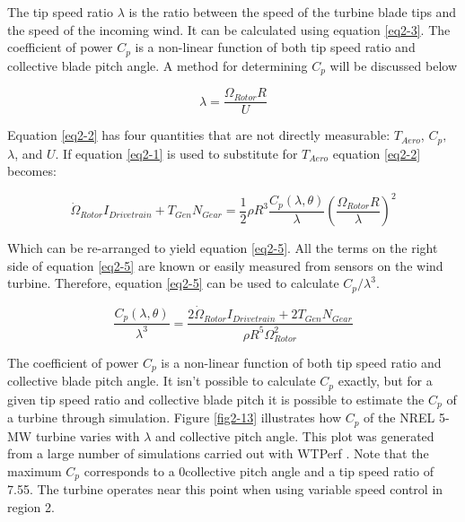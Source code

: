 The tip speed ratio $\lambda$ is the ratio between the speed of the turbine blade tips and the speed of the incoming wind. It can be calculated using equation \ref{eq2-3}. The coefficient of power $C_p$ is a non-linear function of both tip speed ratio and collective blade pitch angle. A method for determining $C_p$ will be discussed below

\begin{equation}
	\lambda=\frac{\Omega_{Rotor} R}{U} \label{eq2-3}
\end{equation}

Equation \ref{eq2-2} has four quantities that are not directly measurable: $T_{Aero}$, $C_p,$ $\lambda$, and $U$. If equation \ref{eq2-1} is used to substitute for $T_{Aero}$ equation \ref{eq2-2} becomes:

\begin{equation}
	\dot{\Omega }_{Rotor} I_{Drivetrain} + T_{Gen} N_{Gear} = \frac{1}{2} \rho R^3 \frac{C_p ( \lambda , \theta )}{\lambda} \left(\frac{\Omega_{Rotor} R}{\lambda}\right)^2   \label{eq2-4}
\end{equation}

Which can be re-arranged to yield equation \ref{eq2-5}. All the terms on the right side of equation \ref{eq2-5} are known or easily measured from sensors on the wind turbine. Therefore, equation \ref{eq2-5} can be used to calculate $C_p / \lambda^3$.

\begin{equation}
	 \frac{C_p ( \lambda, \theta)}{\lambda^3} = \frac{2 \dot{\Omega}_{Rotor} I_{Drivetrain} + 2 T_{Gen} N_{Gear}}{\rho R^5 \Omega^2_{Rotor}} \label{eq2-5}
\end{equation}


The coefficient of power $C_p$ is a non-linear function of both tip speed ratio and collective blade pitch angle. It isn’t possible to calculate $C_p$ exactly, but for a given tip speed ratio and collective blade pitch it is possible to estimate the $C_p$ of a turbine through simulation.  Figure \ref{fig2-13} illustrates how $C_p$ of the NREL 5-MW turbine varies with $\lambda$ and collective pitch angle. This plot was generated from a large number of simulations carried out with WTPerf \cite{platt2012}. Note that the maximum $C_p$ corresponds to a 0\degree collective pitch angle and a tip speed ratio of 7.55. The turbine operates near this point when using variable speed control in region 2. 

